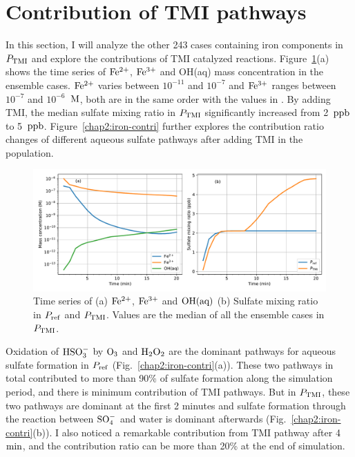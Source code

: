 \documentclass[edeposit,fullpage]{uiucthesis2009}
\makeatletter
\DeclareRobustCommand*\unit[1]
 {\ensuremath{%
   {\thinmuskip3mu\relax
    \def\mu{\text{\textmu}}\def~{\,}%
    \ifx\f@series\testbx\mathbf{#1}\else\mathrm{#1}\fi}}}
\makeatother
\begin{document}
\section{Contribution of TMI pathways}
\label{chap2.5}
In this section, I will analyze the other 243 cases containing iron
components in $P_{\rm TMI}$ and explore the contributions of TMI
catalyzed reactions. Figure~\ref{chap2:iron-conc}(a) shows the time
series of $\rm Fe^{2+}$, $\rm Fe^{3+}$ and OH(aq) mass concentration
in the ensemble cases. $\rm Fe^{2+}$ varies between $10^{-11}$ and
$10^{-7}$ and $\rm Fe^{3+}$ ranges between $10^{-7}$ and
$10^{-6}$~\unit{M}, both are in the same order with the values in
\citep{Deguillaume2005}. By adding TMI, the median sulfate mixing
ratio in $P_{\rm TMI}$ significantly increased from 2~\unit{ppb} to
5~\unit{ppb}. Figure~\ref{chap2:iron-contri} further explores the
contribution ratio changes of different aqueous sulfate pathways after
adding TMI in the population.

\begin{figure}[ht]
    \centering \includegraphics[scale=0.55]{chap2_figs/chap2_with_tmi_fixOH_mass.pdf}
    \caption{Time series of (a) $\rm Fe^{2+}$, $\rm Fe^{3+}$ and $\rm OH(aq)$ (b) Sulfate mixing ratio in $P_{\rm ref}$ and $P_{\rm TMI}$. Values are the median of all the ensemble cases in $P_{\rm TMI}$. }
    \label{chap2:iron-conc}
\end{figure}

Oxidation of $\rm HSO_3^-$ by $\rm O_3$ and $\rm H_2O_2$ are the
dominant pathways for aqueous sulfate formation in $P_{\rm ref}$
(Fig.~\ref{chap2:iron-contri}(a)). These two pathways in total
contributed to more than 90\% of sulfate formation along the
simulation period, and there is minimum contribution of TMI
pathways. But in $P_{\rm TMI}$, these two pathways are dominant at the
first 2 minutes and sulfate formation through the reaction between
$\rm SO_4^-$ and water is dominant afterwards
(Fig.~\ref{chap2:iron-contri}(b)). I also noticed a remarkable
contribution from TMI pathway after 4~\unit{min}, and the contribution
ratio can be more than 20\% at the end of simulation.
\end{document}
